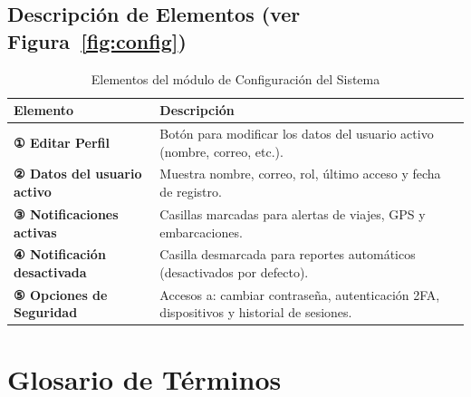 \documentclass[12pt,a4paper]{report}
\begin{document}
\section{Descripción de Elementos (ver Figura~\ref{fig:config})}

\begin{table}[H]
  \centering
  \renewcommand{\arraystretch}{1.4}
  \begin{tabularx}{\textwidth}{@{}L{5.5cm} X@{}}
    \toprule
    \textbf{Elemento} & \textbf{Descripción} \\
    \midrule
    \textbf{① Editar Perfil} & Botón para modificar los datos del usuario activo (nombre, correo, etc.). \\
    \textbf{② Datos del usuario activo} & Muestra nombre, correo, rol, último acceso y fecha de registro. \\
    \textbf{③ Notificaciones activas} & Casillas marcadas para alertas de viajes, GPS y embarcaciones. \\
    \textbf{④ Notificación desactivada} & Casilla desmarcada para reportes automáticos (desactivados por defecto). \\
    \textbf{⑤ Opciones de Seguridad} & Accesos a: cambiar contraseña, autenticación 2FA, dispositivos y historial de sesiones. \\
    \bottomrule
  \end{tabularx}
  \caption{Elementos del módulo de Configuración del Sistema}
\end{table}

\chapter{Glosario de Términos}
\end{document}
